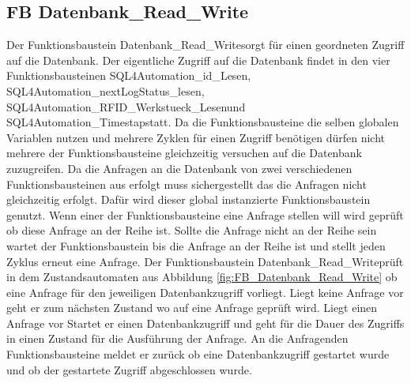 \subsection{FB Datenbank\_Read\_Write}\label{kap:FB_Datenbank_Read_Write}
Der Funktionsbaustein \glqq Datenbank\_Read\_Write\grqq  sorgt für einen geordneten Zugriff auf die Datenbank. Der eigentliche Zugriff auf die Datenbank findet in den vier Funktionsbausteinen \glqq SQL4Automation\_id\_Lesen\grqq , \glqq SQL4Automation\_nextLogStatus\-\_lesen\grqq , \glqq SQL4Automation\_RFID\_Werkstueck\_Lesen\grqq  und \glqq SQL4Automation\_Timestap\grqq \-statt. Da die Funktionsbausteine die selben globalen Variablen nutzen und mehrere Zyklen für einen Zugriff benötigen dürfen nicht mehrere der Funktionsbausteine gleichzeitig versuchen auf die Datenbank zuzugreifen. Da die Anfragen an die Datenbank von zwei verschiedenen Funktionsbausteinen aus erfolgt muss sichergestellt das die Anfragen nicht gleichzeitig erfolgt. Dafür wird dieser global instanzierte Funktionsbaustein genutzt. Wenn einer der Funktionsbausteine eine Anfrage stellen will wird geprüft ob diese Anfrage an der Reihe ist. Sollte die Anfrage nicht an der Reihe sein wartet der Funktionsbaustein bis die Anfrage an der Reihe ist und stellt jeden Zyklus erneut eine Anfrage. Der Funktionsbaustein \glqq Datenbank\_Read\_Write\grqq  prüft in dem Zustandsautomaten aus Abbildung \ref{fig:FB_Datenbank_Read_Write} ob eine Anfrage für den jeweiligen Datenbankzugriff vorliegt. Liegt keine Anfrage vor geht er zum nächsten Zustand wo auf eine Anfrage geprüft wird. Liegt einen Anfrage vor Startet er einen Datenbankzugriff und geht für die Dauer des Zugriffs in einen Zustand für die Ausführung der Anfrage. An die Anfragenden Funktionsbausteine meldet er zurück ob eine Datenbankzugriff gestartet wurde und ob der gestartete Zugriff abgeschlossen wurde.
